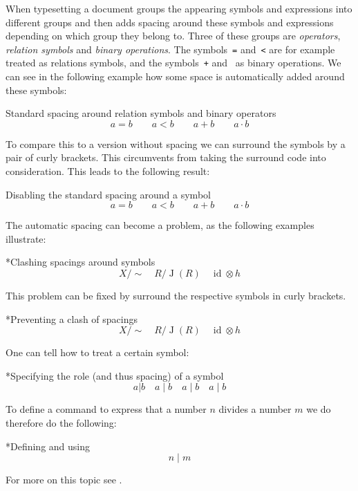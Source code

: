 When typesetting a document  groups the appearing symbols and expressions into different groups and then adds spacing around these symbols and expressions depending on which group they belong to.
Three of these groups are \emph{operators}, \emph{relation symbols} and \emph{binary operations}.
The symbols~\texttt{=} and~\texttt{<} are for example treated as relations symbols, and the symbols~\texttt{+} and~ as binary operations.
We can see in the following example how some space is automatically added around these symbols:
\begin{showlatex}{Standard spacing around relation symbols and binary operators}
\[
  a = b  \qquad  a < b  \qquad  a + b  \qquad  a \cdot b
\]
\end{showlatex}
To compare this to a version without spacing we can surround the symbols by a pair of curly brackets.
This circumvents  from taking the surround code into consideration.
This leads to the following result:
\begin{showlatex}{Disabling the standard spacing around a symbol}
\[
  a {=} b   \qquad  a {<} b  \qquad  a {+} b  \qquad  a {\cdot} b
\]
\end{showlatex}
The automatic spacing can become a problem, as the following examples illustrate:
\begin{showlatex}*{Clashing spacings around symbols}
\[
  X/\sim
  \quad
  R/\operatorname{J}(R)
  \quad
  \operatorname{id} \otimes h
\]
\end{showlatex}
This problem can be fixed by surround the respective symbols in curly brackets.
\begin{showlatex}*{Preventing a clash of spacings}
\[
  X/{\sim}
  \quad
  R/{\operatorname{J}(R)}
  \quad
  {\operatorname{id}} \otimes h
\]
\end{showlatex}
One can tell  how to treat a certain symbol:
\begin{showlatex}*{Specifying the role (and thus spacing) of a symbol}
\[
  a | b
  \quad
  a \mathop{|} b
  \quad
  a \mathrel{|} b
  \quad
  a \mathbin{|} b
\]
\end{showlatex}
To define a command  to express that a number $n$ divides a number $m$ we do therefore do the following:
\begin{showlatex}*{Defining and using }
\newcommand{\divides}{\mathrel{|}}
\[
  n \divides m
\]
\end{showlatex}
For more on this topic see \cite{tex_binrel}.





